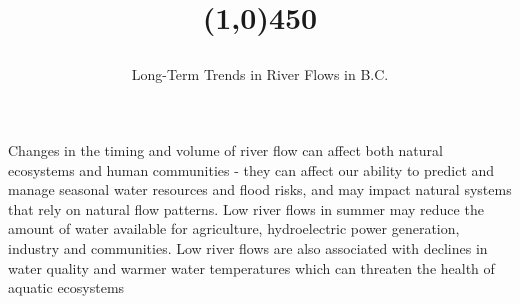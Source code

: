 \documentclass[a4paper, 11pt, parskip=half]{scrartcl}
\title{\vspace{-1cm}
         \flushleft{\texttt{[image: Climate Change.png]}
                    \hspace{0.3cm}\Huge{\topictitle{Climate Change}}}
         \vspace{-0.5cm}
         \begin{center}
         \line(1,0){450}
         \end{center}
  }
\subtitle{\LARGE{Long-Term Trends in River Flows in B.C.}}
\date{}
\begin{document}
\maketitle
\vspace{-2cm} %
\thispagestyle{fancy}

Changes in the timing and volume of river flow can affect both natural
ecosystems and human communities - they can affect our ability to
predict and manage seasonal water resources and flood risks, and may
impact natural systems that rely on natural flow patterns. Low river
flows in summer may reduce the amount of water available for
agriculture, hydroelectric power generation, industry and communities.
Low river flows are also associated with declines in water quality and
warmer water temperatures which can threaten the health of aquatic
ecosystems
\end{document}
